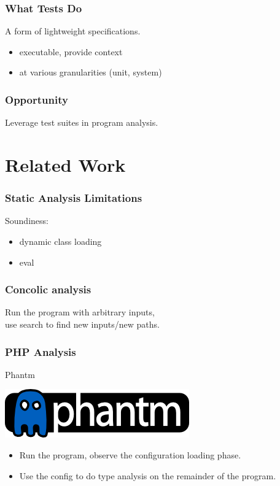 \documentclass{beamer}
\begin{document}
\begin{frame}
  \frametitle{What Tests Do}

  A form of lightweight specifications.
  \begin{itemize}
  \item executable, provide context
  \item at various granularities (unit, system)
  \end{itemize}
\end{frame}

\begin{frame}
  \frametitle{Opportunity}
  Leverage test suites in program analysis.
\end{frame}

\section{Related Work}

\begin{frame}
  \frametitle{Static Analysis Limitations}
Soundiness:
\begin{itemize}
\item dynamic class loading
\item eval
\end{itemize}
\end{frame}


\begin{frame}
  \frametitle{Concolic analysis}

Run the program with arbitrary inputs, \\
use search to find new inputs/new paths.
\end{frame}

\begin{frame}
  \frametitle{PHP Analysis}

Phantm
\begin{center}
\includegraphics[width=.2\textwidth]{images/phantm-blue-solid.png}
\end{center}
\begin{itemize}
\item Run the program, observe the configuration loading phase.
\item Use the config to do type analysis on the remainder of the program.
\end{itemize}
\end{frame}
\end{document}
